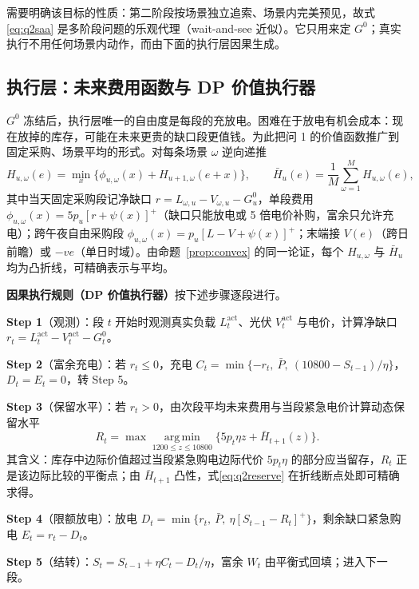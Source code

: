 需要明确该目标的性质：第二阶段按场景独立追索、场景内完美预见，故式\eqref{eq:q2saa} 是多阶段问题的乐观代理（wait-and-see 近似）。它只用来定 $G^0$；真实执行不用任何场景内动作，而由下面的执行层因果生成。

\subsection{执行层：未来费用函数与 DP 价值执行器}\label{sec:q2dp}
$G^0$ 冻结后，执行层唯一的自由度是每段的充放电。困难在于放电有机会成本：现在放掉的库存，可能在未来更贵的缺口段更值钱。为此把问 1 的价值函数推广到固定采购、场景平均的形式。对每条场景 $\omega$ 逆向递推
\begin{equation}
H_{u,\omega}(e)=\min_{x}\bigl\{\phi_{u,\omega}(x)+H_{u+1,\omega}(e+x)\bigr\},\qquad
\bar H_u(e)=\frac1M\sum_{\omega=1}^{M}H_{u,\omega}(e),
\label{eq:q2hbar}
\end{equation}
其中当天固定采购段记净缺口 $r=L_{\omega,u}-V_{\omega,u}-G^0_u$，单段费用 $\phi_{u,\omega}(x)=5p_u[r+\psi(x)]^+$（缺口只能放电或 5 倍电价补购，富余只允许充电）；跨午夜自由采购段 $\phi_{u,\omega}(x)=p_u[L-V+\psi(x)]^+$；末端接 $V(e)$（跨日前瞻）或 $-ve$（单日时域）。由命题~\ref{prop:convex} 的同一论证，每个 $H_{u,\omega}$ 与 $\bar H_u$ 均为凸折线，可精确表示与平均。


\textbf{因果执行规则（DP 价值执行器）}按下述步骤逐段进行。

\textbf{Step 1}（观测）：段 $t$ 开始时观测真实负载 $L_t^{\mathrm{act}}$、光伏 $V_t^{\mathrm{act}}$ 与电价，计算净缺口 $r_t=L_t^{\mathrm{act}}-V_t^{\mathrm{act}}-G^0_t$。

\textbf{Step 2}（富余充电）：若 $r_t\le0$，充电 $C_t=\min\{-r_t,\ \bar P,\ (10800-S_{t-1})/\eta\}$，$D_t=E_t=0$，转 Step 5。

\textbf{Step 3}（保留水平）：若 $r_t>0$，由次段平均未来费用与当段紧急电价计算动态保留水平
\begin{equation}
R_t=\max\operatorname*{arg\,min}_{1200\le z\le10800}\bigl\{5p_t\eta z+\bar H_{t+1}(z)\bigr\}.
\label{eq:q2reserve}
\end{equation}
其含义：库存中边际价值超过当段紧急购电边际代价 $5p_t\eta$ 的部分应当留存，$R_t$ 正是该边际比较的平衡点；由 $\bar H_{t+1}$ 凸性，式\eqref{eq:q2reserve} 在折线断点处即可精确求得。

\textbf{Step 4}（限额放电）：放电 $D_t=\min\{r_t,\ \bar P,\ \eta[S_{t-1}-R_t]^+\}$，剩余缺口紧急购电 $E_t=r_t-D_t$。

\textbf{Step 5}（结转）：$S_t=S_{t-1}+\eta C_t-D_t/\eta$，富余 $W_t$ 由平衡式回填；进入下一段。


